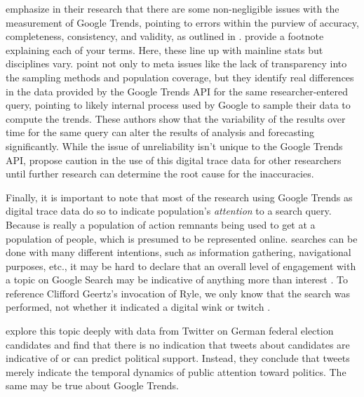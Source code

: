 \citet{cebrian_domenech22} emphasize in their research that there are some
non-negligible issues with the measurement of Google Trends, pointing to errors
within the purview of accuracy, completeness, consistency, and validity, as
outlined in \citet{KarrDataQuality}. %
provide a footnote explaining each of your terms. Here, these line up with
mainline stats but disciplines vary. \citet{cebrian_domenech22} point not only
to meta issues like the lack of transparency into the sampling methods and
population coverage, but they identify real differences in the data provided by
the Google Trends API for the same researcher-entered query, pointing to likely
internal process used by Google to sample their data to compute the trends.
These authors show that the variability of the results over time for the same
query can alter the results of analysis and forecasting significantly. While the
issue of unreliability isn't unique to the Google Trends API,
\citet{cebrian_domenech22} propose caution in the use of this digital trace data
for other researchers until further research can determine the root cause for
the inaccuracies.

Finally, it is important to note that most of the research using Google Trends
as digital trace data do so to indicate population's \textit{attention} to a
search query. Because %
is really a population of action remnants being used to get at a population of
people, which is presumed to be represented online. searches can be done with
many different intentions, such as information gathering, navigational purposes,
etc., it may be hard to declare that an overall level of engagement with a topic
on Google Search may be indicative of anything more than interest
\citep{da2011search}. To reference Clifford Geertz's invocation of Ryle, we only
know that the search was performed, not whether it indicated a digital wink or
twitch \citeyearpar{geertz1973thick}.

\citet{jungherr_etal17} explore this topic deeply with data from
Twitter on German federal election candidates and find that there is no
indication that tweets about candidates are indicative of or can predict 
political support. Instead, they conclude that tweets merely indicate the
temporal dynamics of public attention toward politics. The same may
be true about Google Trends. 

